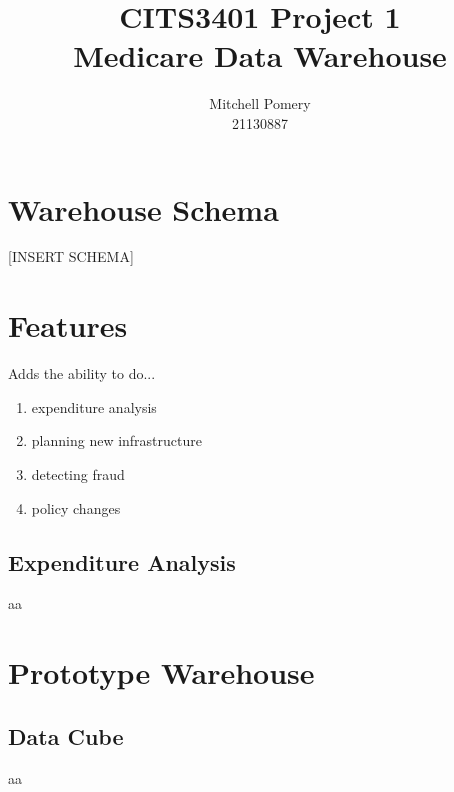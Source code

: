 \documentclass[a4paper,12pt,openany]{article}
\begin{document}
\title{CITS3401 Project 1\\
Medicare Data Warehouse}
\author{Mitchell Pomery\\
21130887}
\date{}
\maketitle


\section{Warehouse Schema}
	[INSERT SCHEMA]
\section{Features}
	Adds the ability to do...
	\begin{enumerate}
		\item expenditure analysis
		\item planning new infrastructure
		\item detecting fraud
		\item policy changes
	\end{enumerate}

\subsection{Expenditure Analysis}
	aa
\section{Prototype Warehouse}
\subsection{Data Cube}
	aa
\end{document}
